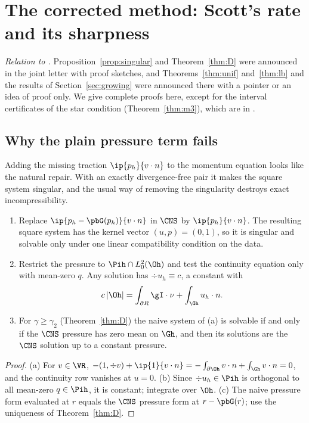 \section{The corrected method: Scott's rate and its sharpness}\label{sec:corrected}

\emph{Relation to \cite{CavalcantePadhiLetter}.} Proposition~\ref{prop:singular} and Theorem~\ref{thm:D} were announced in the joint letter \cite{CavalcantePadhiLetter} with proof sketches, and Theorems~\ref{thm:unif} and~\ref{thm:lb} and the results of Section~\ref{sec:growing} were announced there with a pointer or an idea of proof only. We give complete proofs here, except for the interval certificates of the star condition (Theorem~\ref{thm:m3}), which are in \cite{PadhiExt}.

\subsection{Why the plain pressure term fails}
Adding the missing traction $\ip{p_h}{v\cdot n}$ to the momentum equation looks like the natural repair. With an exactly divergence-free pair it makes the square system singular, and the usual way of removing the singularity destroys exact incompressibility.

\begin{proposition}\label{prop:singular}
\begin{enumerate}[label=(\alph*)]
\item Replace $\ip{p_h-\pbG(p_h)}{v\cdot n}$ in $\CNS$ by $\ip{p_h}{v\cdot n}$. The resulting square system has the kernel vector $(u,p)=(0,1)$, so it is singular and solvable only under one linear compatibility condition on the data.
\item Restrict the pressure to $\Pih\cap L^2_0(\Oh)$ and test the continuity equation only with mean-zero $q$. Any solution has $\div u_h\equiv c$, a constant with
\[
c\,|\Oh|=\int_{\partial R}\gI\cdot\nu+\int_{\Gh}u_h\cdot n .
\]
\item For $\gamma\ge\gamma_2$ (Theorem~\ref{thm:D}) the naive system of (a) is solvable if and only if the $\CNS$ pressure has zero mean on $\Gh$, and then its solutions are the $\CNS$ solution up to a constant pressure.
\end{enumerate}
\end{proposition}

\begin{proof}
(a) For $v\in\VR$, $-(1,\div v)+\ip{1}{v\cdot n}=-\int_{\partial\Oh}v\cdot n+\int_{\Gh}v\cdot n=0$, and the continuity row vanishes at $u=0$. (b) Since $\div u_h\in\Pih$ is orthogonal to all mean-zero $q\in\Pih$, it is constant; integrate over $\Oh$. (c) The naive pressure form evaluated at $r$ equals the $\CNS$ pressure form at $r-\pbG(r)$; use the uniqueness of Theorem~\ref{thm:D}.
\end{proof}

